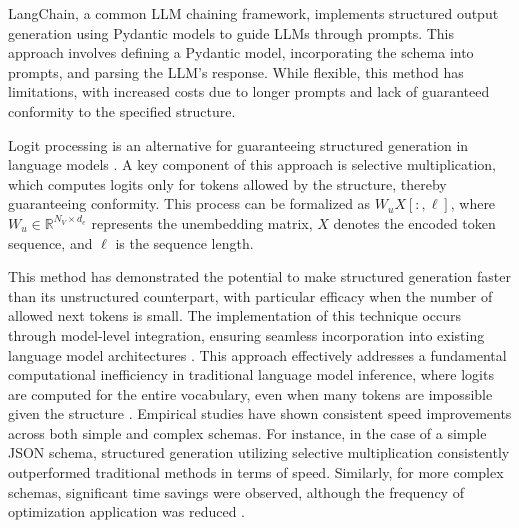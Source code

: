 \documentclass[a4paper, oneside]{discothesis}
\begin{document}
LangChain, a common LLM chaining framework, implements structured output generation using Pydantic models to guide LLMs through prompts. This approach involves defining a Pydantic model, incorporating the schema into prompts, and parsing the LLM's response. While flexible, this method has limitations, with increased costs due to longer prompts and lack of guaranteed conformity to the specified structure.

Logit processing is an alternative for guaranteeing structured generation in language models \cite{chaudhari2023logit}. A key component of this approach is selective multiplication, which computes logits only for tokens allowed by the structure, thereby guaranteeing conformity. This process can be formalized as $W_uX[:,\ell]$, where $W_u \in \mathbb{R}^{N_V \times d_e}$ represents the unembedding matrix, $X$ denotes the encoded token sequence, and $\ell$ is the sequence length.

This method has demonstrated the potential to make structured generation faster than its unstructured counterpart, with particular efficacy when the number of allowed next tokens is small. The implementation of this technique occurs through model-level integration, ensuring seamless incorporation into existing language model architectures \cite{chaudhari2023logit}. This approach effectively addresses a fundamental computational inefficiency in traditional language model inference, where logits are computed for the entire vocabulary, even when many tokens are impossible given the structure \cite{willard2023efficient}. Empirical studies have shown consistent speed improvements across both simple and complex schemas. For instance, in the case of a simple JSON schema, structured generation utilizing selective multiplication consistently outperformed traditional methods in terms of speed. Similarly, for more complex schemas, significant time savings were observed, although the frequency of optimization application was reduced \cite{chaudhari2023logit}.
\end{document}
